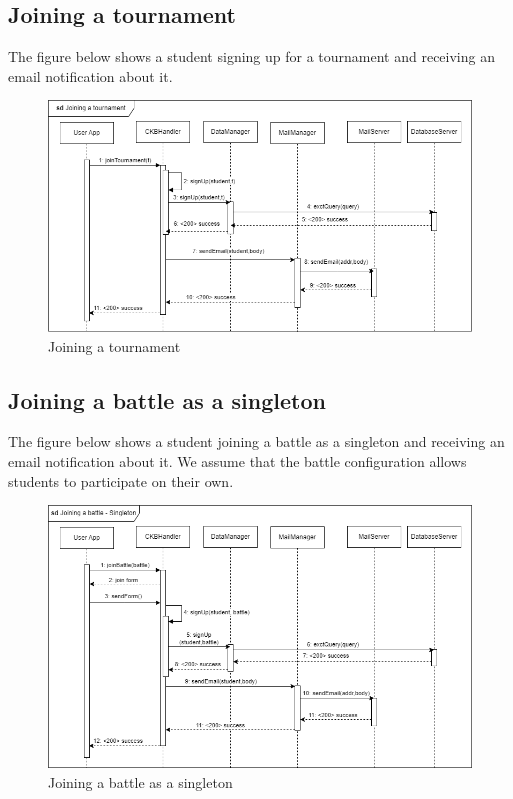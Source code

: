 \subsection{Joining a tournament}
The figure below shows a student signing up for a tournament and receiving an email notification about it.\\
\begin{figure}[H]
    \centering
    \includegraphics[width=1\textwidth]{images/seq_diagrams/joining_tournament_DD.png}
    \caption{Joining a tournament}
\end{figure}
\clearpage

\subsection{Joining a battle as a singleton}
The figure below shows a student joining a battle as a singleton and receiving an email notification about it. We assume that 
the battle configuration allows students to participate on their own.\\
\begin{figure}[H]
    \centering
    \includegraphics[width=1\textwidth]{images/seq_diagrams/joining_battle_singleton_DD.png}
    \caption{Joining a battle as a singleton}
\end{figure}
\clearpage

